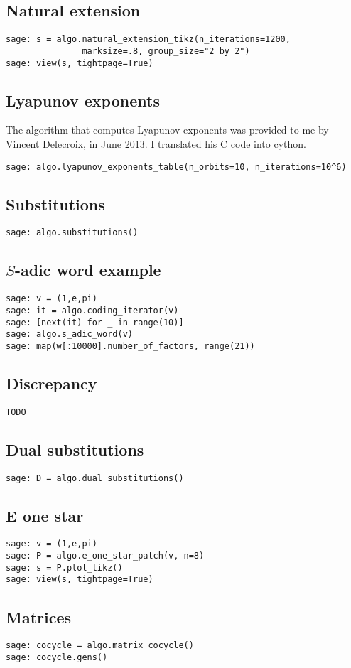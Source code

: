 \subsection{Natural extension}
\begin{verbatim}
sage: s = algo.natural_extension_tikz(n_iterations=1200, 
               marksize=.8, group_size="2 by 2")
sage: view(s, tightpage=True)
\end{verbatim}
\subsection{Lyapunov exponents}
The algorithm that computes Lyapunov exponents was provided to me
by Vincent Delecroix, in June 2013. I translated his C code into cython.
\begin{verbatim}
sage: algo.lyapunov_exponents_table(n_orbits=10, n_iterations=10^6)
\end{verbatim}
\subsection{Substitutions}
\begin{verbatim}
sage: algo.substitutions()
\end{verbatim}
\subsection{$S$-adic word example}
\begin{verbatim}
sage: v = (1,e,pi)
sage: it = algo.coding_iterator(v)
sage: [next(it) for _ in range(10)]
sage: algo.s_adic_word(v)
sage: map(w[:10000].number_of_factors, range(21))  
\end{verbatim}
\subsection{Discrepancy}
\begin{verbatim}
TODO
\end{verbatim}
\subsection{Dual substitutions}
\begin{verbatim}
sage: D = algo.dual_substitutions()
\end{verbatim}
\subsection{E one star}
\begin{verbatim}
sage: v = (1,e,pi)
sage: P = algo.e_one_star_patch(v, n=8)
sage: s = P.plot_tikz()
sage: view(s, tightpage=True)
\end{verbatim}
\subsection{Matrices}
\begin{verbatim}
sage: cocycle = algo.matrix_cocycle()
sage: cocycle.gens()
\end{verbatim}
\newpage
